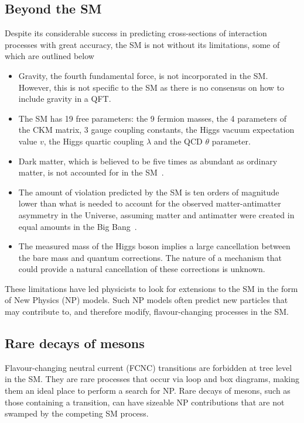 \subsection{Beyond the SM}
\label{sec:theory:limitations}

Despite its considerable success in predicting cross-sections of interaction processes with great accuracy, the SM is not without its limitations, some of which are outlined below

\begin{itemize}
  \item Gravity, the fourth fundamental force, is not incorporated in the SM. However, this is not specific to the SM as there is no consensus on how to include gravity in a QFT. 
  \item The SM has 19 free parameters: the 9 fermion masses, the 4 parameters of the CKM matrix, 3 gauge coupling constants, the Higgs vacuum expectation value $v$, the Higgs quartic coupling $\lambda$ and the QCD $\theta$ parameter. 
  \item Dark matter, which is believed to be five times as abundant as ordinary matter, is not accounted for in the SM~\cite{wmap,planck}.
  \item The amount of \CP violation predicted by the SM is ten orders of magnitude lower than what is needed to account for the observed matter-antimatter asymmetry in the Universe, assuming matter and antimatter were created in equal amounts in the Big Bang~\cite{sakharov}.
  \item The measured mass of the Higgs boson implies a large cancellation between the bare mass and quantum corrections. The nature of a mechanism that could provide a natural cancellation of these corrections is unknown.
\end{itemize}

\noindent These limitations have led physicists to look for extensions to the SM in the form of New Physics (NP) models. Such NP models often predict new particles that may contribute to, and therefore modify, flavour-changing processes in the SM.

\subsection{Rare decays of \B mesons}
\label{sec:theory:rare}

Flavour-changing neutral current (FCNC) transitions are forbidden at tree level in the SM. They are rare processes that occur via loop and box diagrams, making them an ideal place to perform a search for NP. Rare decays of \B mesons, such as those containing a \btosll transition, can have sizeable NP contributions that are not swamped by the competing SM process. 

